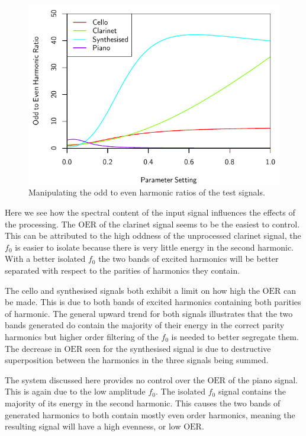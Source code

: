 		\begin{figure}[h!]
			\centering
			\includegraphics{chapter6/Images/MoveParities.pdf}
			\caption{Manipulating the odd to even harmonic ratios of the test signals.}
			\label{fig:MoveParities}
		\end{figure}

		Here we see how the spectral content of the input signal influences the effects of the processing.  The
		$\mathrm{OER}$ of the clarinet signal seems to be the easiest to control. This can be attributed to the
		high oddness of the unprocessed clarinet signal, the $f_{0}$ is easier to isolate because there is very
		little energy in the second harmonic. With a better isolated $f_{0}$ the two bands of excited harmonics
		will be better separated with respect to the parities of harmonics they contain.

		The cello and synthesised signals both exhibit a limit on how high the $\mathrm{OER}$ can be made. This
		is due to both bands of excited harmonics containing both parities of harmonic.  The general upward trend
		for both signals illustrates that the two bands generated do contain the majority of their energy in the
		correct parity harmonics but higher order filtering of the $f_{0}$ is needed to better segregate them. The
		decrease in $\mathrm{OER}$ seen for the synthesised signal is due to destructive superposition between
		the harmonics in the three signals being summed.

		The system discussed here provides no control over the $\mathrm{OER}$ of the piano signal. This is again
		due to the low amplitude $f_{0}$. The isolated $f_{0}$ signal contains the majority of its energy in the
		second harmonic. This causes the two bands of generated harmonics to both contain mostly even order
		harmonics, meaning the resulting signal will have a high evenness, or low $\mathrm{OER}$.

